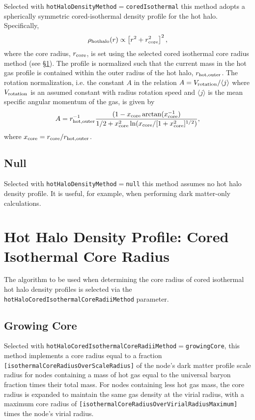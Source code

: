 Selected with {\tt hotHaloDensityMethod}$=${\tt coredIsothermal} this method adopts a spherically symmetric cored-isothermal density profile for the hot halo. Specifically,
\begin{equation}
 \rho_{\rm hot halo}(r) \propto \left[ r^2 + r_{\rm core}^2 \right]^2,
\end{equation}
where the core radius, $r_{\rm core}$, is set using the selected cored isothermal core radius method (see \S\ref{sec:hotHaloDensityProfileCoredIsothermalCoreRadius}). The profile is normalized such that the current mass in the hot gas profile is contained within the outer radius of the hot halo, $r_{\rm hot, outer}$. The rotation normalization, i.e. the constant $A$ in the relation $A = V_{\rm rotation}/\langle j \rangle$ where $V_{\rm rotation}$ is an assumed constant with radius rotation speed and $\langle j \rangle$ is the mean specific angular momentum of the gas, is given by
\begin{equation}
A = r_{\rm hot, outer}^{-1} {(1-x_{\rm core}\arctan(x_{\rm core}^{-1}) \over 1/2 + x_{\rm core}^2 \ln(x_{\rm core}/[1+x_{\rm core}^2]^{1/2})},
\end{equation}
where $x_{\rm core}=r_{\rm core}/r_{\rm hot, outer}$.

\subsection{Null}

Selected with {\tt hotHaloDensityMethod}$=${\tt null} this method assumes no hot halo density profile. It is useful, for example, when performing dark matter-only calculations.

\section{Hot Halo Density Profile: Cored Isothermal Core Radius}\label{sec:hotHaloDensityProfileCoredIsothermalCoreRadius}

The algorithm to be used when determining the core radius of cored isothermal hot halo density profiles is selected via the {\tt hotHaloCoredIsothermalCoreRadiiMethod} parameter.

\subsection{Growing Core}

Selected with {\tt hotHaloCoredIsothermalCoreRadiiMethod}$=${\tt growingCore}, this method implements a core radius equal to a fraction {\tt [isothermalCoreRadiusOverScaleRadius]} of the node's dark matter profile scale radius for nodes containing a mass of hot gas equal to the universal baryon fraction times their total mass. For nodes containing less hot gas mass, the core radius is expanded to maintain the same gas density at the virial radius, with a maximum core radius of {\tt [isothermalCoreRadiusOverVirialRadiusMaximum]} times the node's virial radius.

